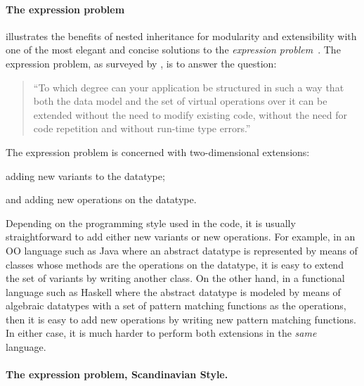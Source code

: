 \paragraph{The expression problem}

\citet{ernst2004expression} illustrates the benefits of nested inheritance for modularity
and extensibility with one of the most elegant and concise solutions to the
\emph{expression problem}~\citep{wadler1998expression}. The expression problem,
as surveyed by \citet{togersen:2004}, is to answer the question:
\begin{quote}
  ``To which degree can your application be structured in such a way that both
  the data model and the set of virtual operations over it can be extended
  without the need to modify existing code, without the need for code repetition
  and without run-time type errors.''
\end{quote}
The expression problem is concerned with two-dimensional extensions:
\begin{inparaenum}[(1)]
\item adding new variants to the datatype;
\item and adding new operations on the datatype.
\end{inparaenum}
Depending on the programming style used in the code, it is usually
straightforward to add either new variants or new operations. For example, in an
OO language such as Java where an abstract datatype is represented by means of
classes whose methods are the operations on the datatype, it is easy to extend
the set of variants by writing another class. On the other hand, in a functional
language such as Haskell where the abstract datatype is modeled by means of
algebraic datatypes with a set of pattern matching functions as the operations,
then it is easy to add new operations by writing new pattern matching functions.
In either case, it is much harder to perform both extensions in the
\emph{same} language.


\paragraph{The expression problem, Scandinavian Style.}


